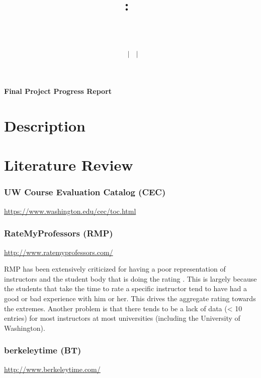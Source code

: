 \documentclass{article}
\title{
    \vspace{2in}
    \textmd{\textbf{\hmwkClass:\ \hmwkTitle}}\\
    \vspace{0.2in}\large{\textit{\hmwkClassInstructor\ \hmwkClassTime}}\\
    \author{\textbf{\hmwkAuthorName\ $\vert$ \hmwkAuthorCSE\ $\vert$ \hmwkAuthorId}}
}
\date{}
\begin{document}
\begin{center}
\LARGE
\textbf{Final Project Progress Report}
\end{center}

\section{Description}

\section{Literature Review}

\subsubsection{UW Course Evaluation Catalog (CEC) \cite{cec}}
{\color{blue} \href{https://www.washington.edu/cec/toc.html}{https://www.washington.edu/cec/toc.html}}

\subsubsection{RateMyProfessors (RMP) \cite{ratemyprofessors}}
{\color{blue} \href{http://www.ratemyprofessors.com/}{http://www.ratemyprofessors.com/}}

RMP has been extensively criticized for having a poor representation of instructors and the student body that is doing the rating \cite{coladarci2007ratemyprofessors,felton2008attractiveness,sonntag2009empirical}. This is largely because the students that take the time to rate a specific instructor tend to have had a good or bad experience with him or her. This drives the aggregate rating towards the extremes. Another problem is that there tends to be a lack of data (< 10 entries) for most instructors at most universities (including the University of Washington).

\subsubsection{berkeleytime (BT) \cite{berkeleytime}}
{\color{blue} \href{http://www.berkeleytime.com/}{http://www.berkeleytime.com/}}



\end{document}
